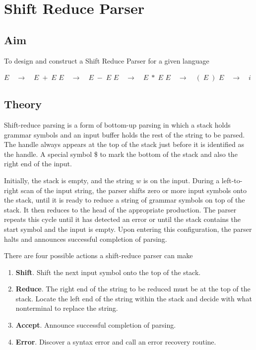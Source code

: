 \clearpage
\chapter{Shift Reduce Parser}

\section{Aim}
To design and construct a Shift Reduce Parser for a given language
\begin{algorithmic}[1]
	\State $E \quad \rightarrow \quad E \; + \; E$
	\State $E \quad \rightarrow \quad E \; - \; E$
	\State $E \quad \rightarrow \quad E \; * \; E$
	\State $E \quad \rightarrow \quad ( \; E \; )$
	\State $E \quad \rightarrow \quad i$
\end{algorithmic}




\section{Theory}
Shift-reduce parsing is a form of bottom-up parsing in which a stack holds
grammar symbols and an input buffer holds the rest of the string to be parsed.
The handle always appears at the top of the stack just before
it is identified as the handle.
A special symbol \$ to mark the bottom of the stack and also the right end of the
input. 

Initially, the stack is empty, and the string $w$ is on the input. During a left-to-right scan of the input string, the parser shifts zero or more
input symbols onto the stack, until it is ready to reduce a string of grammar
symbols on top of the stack. It then reduces to the head of the appropriate production. The parser repeats this cycle until it has detected an error or until
the stack contains the start symbol and the input is empty. Upon entering this configuration, the parser halts and announces successful
completion of parsing.

There are four possible actions a shift-reduce parser can make
\begin{enumerate}
	\item \textbf{Shift}.  Shift the next input symbol onto the top of the stack.
	\item \textbf{Reduce}. The right end of the string to be reduced must be at the top of
the stack. Locate the left end of the string within the stack and decide
with what nonterminal to replace the string.
	\item \textbf{Accept}. Announce successful completion of parsing.
	\item \textbf{Error}. Discover a syntax error and call an error recovery routine.
\end{enumerate}


